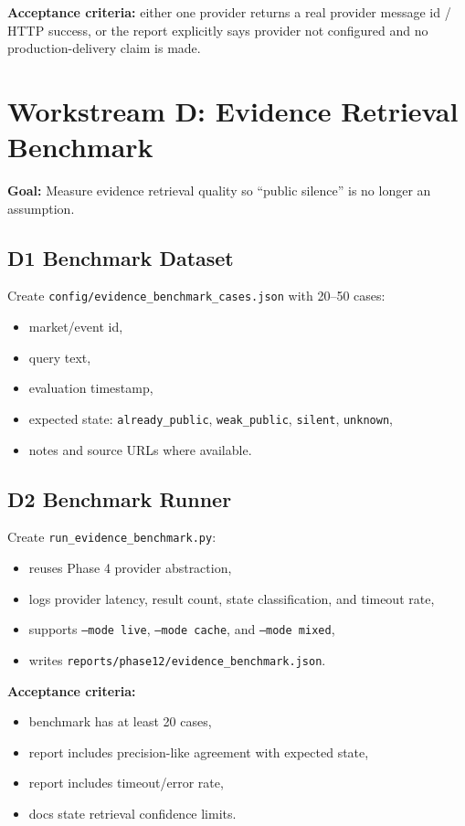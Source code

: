 \documentclass{article}
\begin{document}
\textbf{Acceptance criteria:} either one provider returns a real provider message id / HTTP success, or the report explicitly says provider not configured and no production-delivery claim is made.

\section*{Workstream D: Evidence Retrieval Benchmark}
\textbf{Goal:} Measure evidence retrieval quality so ``public silence'' is no longer an assumption.

\subsection*{D1 Benchmark Dataset}
Create \texttt{config/evidence\_benchmark_cases.json} with 20--50 cases:
\begin{itemize}[nosep]
\item market/event id,
\item query text,
\item evaluation timestamp,
\item expected state: \texttt{already\_public}, \texttt{weak\_public}, \texttt{silent}, \texttt{unknown},
\item notes and source URLs where available.
\end{itemize}

\subsection*{D2 Benchmark Runner}
Create \texttt{run\_evidence\_benchmark.py}:
\begin{itemize}[nosep]
\item reuses Phase 4 provider abstraction,
\item logs provider latency, result count, state classification, and timeout rate,
\item supports \texttt{--mode live}, \texttt{--mode cache}, and \texttt{--mode mixed},
\item writes \texttt{reports/phase12/evidence\_benchmark.json}.
\end{itemize}

\textbf{Acceptance criteria:}
\begin{itemize}[nosep]
\item benchmark has at least 20 cases,
\item report includes precision-like agreement with expected state,
\item report includes timeout/error rate,
\item docs state retrieval confidence limits.
\end{itemize}
\end{document}
